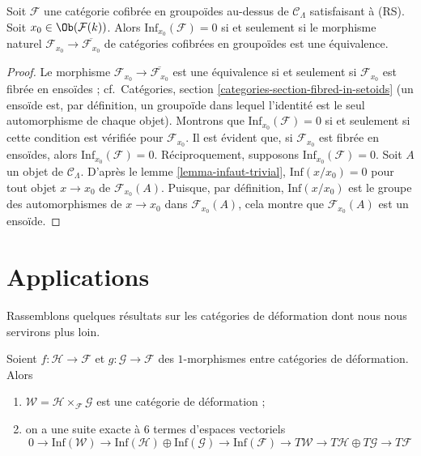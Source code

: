 \begin{lemma}
\label{lemma-infdef-trivial}
Soit $\mathcal{F}$ une catégorie cofibrée en groupoïdes au-dessus de
$\mathcal{C}_\Lambda$ satisfaisant à (RS). Soit
$x_0 \in \Ob(\mathcal{F}(k))$. Alors $\text{Inf}_{x_0}(\mathcal{F}) = 0$ si
et seulement si le morphisme naturel
$\mathcal{F}_{x_0} \to \overline{\mathcal{F}_{x_0}}$ de catégories cofibrées
en groupoïdes est une équivalence.
\end{lemma}

\begin{proof}
Le morphisme $\mathcal{F}_{x_0} \to \overline{\mathcal{F}_{x_0}}$ est une
équivalence si et seulement si $\mathcal{F}_{x_0}$ est fibrée en ensoïdes ;
cf.\ Catégories, section \ref{categories-section-fibred-in-setoids} (un
ensoïde est, par définition, un groupoïde dans lequel l'identité est le seul
automorphisme de chaque objet). Montrons que
$\text{Inf}_{x_0}(\mathcal{F}) = 0$ si et seulement si cette condition est
vérifiée pour $\mathcal{F}_{x_0}$. Il est évident que, si
$\mathcal{F}_{x_0}$ est fibrée en ensoïdes, alors
$\text{Inf}_{x_0}(\mathcal{F}) = 0$. Réciproquement, supposons
$\text{Inf}_{x_0}(\mathcal{F}) = 0$. Soit $A$ un objet de
$\mathcal{C}_\Lambda$. D'après le lemme \ref{lemma-infaut-trivial},
$\text{Inf}(x/x_0) = 0$ pour tout objet $x \to x_0$ de
$\mathcal{F}_{x_0}(A)$. Puisque, par définition, $\text{Inf}(x/x_0)$ est le
groupe des automorphismes de $x \to x_0$ dans $\mathcal{F}_{x_0}(A)$, cela
montre que $\mathcal{F}_{x_0}(A)$ est un ensoïde.
\end{proof}








\section{Applications}
\label{section-applications}

\noindent
Rassemblons quelques résultats sur les catégories de déformation dont nous
nous servirons plus loin.

\begin{lemma}
\label{lemma-deformation-categories-fiber-product-morphisms}
Soient $f : \mathcal{H} \to \mathcal{F}$ et
$g : \mathcal{G} \to \mathcal{F}$ des $1$-morphismes entre catégories de
déformation. Alors
\begin{enumerate}
\item $\mathcal{W} = \mathcal{H} \times_\mathcal{F} \mathcal{G}$ est une
catégorie de déformation ;
\item on a une suite exacte à $6$ termes d'espaces vectoriels
$$
0 \to \text{Inf}(\mathcal{W})
\to \text{Inf}(\mathcal{H}) \oplus \text{Inf}(\mathcal{G})
\to \text{Inf}(\mathcal{F}) \to
T\mathcal{W} \to T\mathcal{H} \oplus T\mathcal{G} \to T\mathcal{F}
$$
\end{enumerate}
\end{lemma}

